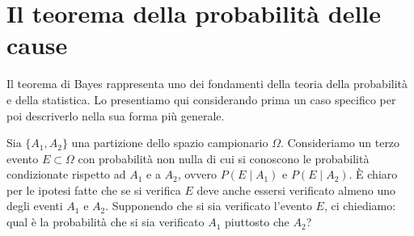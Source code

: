 %
%

\section{Il teorema della probabilità delle cause}
\label{sec:bayes_theorem}

Il teorema di Bayes rappresenta uno dei fondamenti della teoria della probabilità e della statistica. 
Lo presentiamo qui considerando prima un caso specifico per poi descriverlo nella sua forma più generale.

Sia $\{A_1, A_2\}$ una partizione dello spazio campionario $\Omega$. 
Consideriamo un terzo evento $E \subset \Omega$ con probabilità non nulla di cui si conoscono le probabilità condizionate rispetto ad $A_1$ e a $A_2$, ovvero $P(E \mid A_1)$ e $P(E \mid A_2)$. 
È chiaro per le ipotesi fatte che se si verifica $E$ deve anche essersi verificato almeno uno degli eventi $A_1$ e $A_2$. 
Supponendo che si sia verificato l'evento $E$, ci chiediamo: qual è la probabilità che si sia verificato $A_1$ piuttosto che $A_2$? 
\begin{figure}[h!]
\centering
{}
\end{figure}

